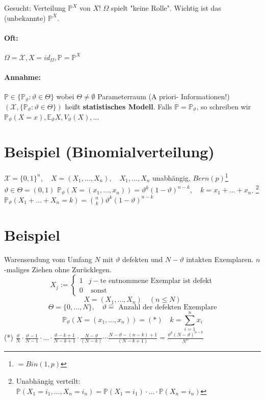 \documentclass[a4paper,11pt,notitlepage]{report}
\newcommand{\Prim}{{\ensuremath{\mathbb{P}}}}
\newcommand{\E}{{\ensuremath{\mathbb{E}}}}
\begin{document}
Gesucht: Verteilung $\Prim^X$ von $X$!
\newline
$\Omega$ spielt "keine Rolle".
\newline
Wichtig ist das (unbekannte) $\Prim^X$.

\paragraph{Oft:} $\Omega = \mathcal{X}, X = id_{\Omega}, \Prim= \Prim^X$
\paragraph{Annahme:} $\Prim \in \{\Prim_\vartheta \colon \vartheta \in \Theta\}$ wobei $\Theta \neq \emptyset$ Parameterraum (A priori- Informationen!)
\newline
$(\mathcal{X}, \{\Prim_\vartheta \colon \vartheta \in \Theta\})$ heißt \textbf{statistisches Modell}.
\newline
Falls $\Prim = \Prim_\vartheta$, so schreiben wir $\Prim_\vartheta (X=x), \E_\vartheta X, V_\vartheta(X), \ldots$

\section{Beispiel (Binomialverteilung)}
$\mathcal{X} = \{0,1\}^n, \quad X = (X_1, \ldots, X_n), \quad X_1, \ldots, X_n$ unabhängig, $Bern(p)$\footnote{$= Bin(1,p)$}
\newline
$\vartheta \in \Theta = (0,1)$
\newline
$\Prim_\vartheta (X= (x_1, \ldots, x_n)) = \vartheta^k (1- \vartheta)^{n-k}, \quad k = x_1 + \ldots + x_n$.
\newline
\footnote{Unabhängig verteilt: $\Prim(X_1 = i_1, \ldots, X_n = i_n) = \Prim(X_1 = i_1) \cdot \ldots \cdot \Prim(X_n = i_n)$}
\newline
$\Prim_\vartheta(X_1 + \ldots + X_n = k) = {n \choose k} \vartheta^k (1-\vartheta)^{n-k}$

\section{Beispiel}
Warensendung vom Umfang $N$ mit $\vartheta$ defekten und $N-\vartheta$ intakten Exemplaren. $n$-maliges Ziehen ohne Zurücklegen.
$$X_j :=  \begin{cases} 1 & j-\text{te entnommene Exemplar ist defekt} \\ 0 & \text{ sonst} \end{cases}$$
$$X = (X_1, \ldots, X_n) \quad (n \leq N)$$
$$\Theta = \{0, \ldots, N\}, \quad \vartheta \hat{=} \text{ Anzahl der defekten Exemplare}$$
$$\Prim_\vartheta (X= (x_1, \ldots, x_n)) = (*) \quad k = \sum\limits_{i=1}^n{x_i}$$
(*) $\frac{\vartheta}{N} \cdot \frac{\vartheta - 1}{N-1} \cdot \ldots \cdot \frac{\vartheta - k + 1}{N - k + 1} \cdot \frac{N - \vartheta}{(N-k)} \cdots \frac{N - \vartheta - (n-k) +1}{(N-k+1)} = \frac{\vartheta^{\underline{k}} (N-\vartheta)^{n-\underline{k}}}{N^{\underline{n}}}$
\end{document}
